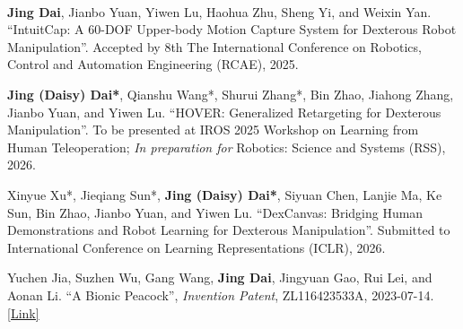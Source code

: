 
\vspace{-17mm}

\begin{cventries}
    \cventry
    {} %
    {\ } %
    {\ } %
    {} %
    {
        \begin{cvitemize2}
            \item \textbf{Jing Dai}, Jianbo Yuan, Yiwen Lu, Haohua Zhu, Sheng Yi, and Weixin Yan. ``IntuitCap: A 60-DOF Upper-body Motion Capture System for Dexterous Robot Manipulation''. Accepted by 8th The International Conference on Robotics, Control and Automation Engineering (RCAE), 2025.
            \item \textbf{Jing (Daisy) Dai*}, Qianshu Wang*, Shurui Zhang*, Bin Zhao, Jiahong Zhang, Jianbo Yuan, and Yiwen Lu. ``HOVER: Generalized Retargeting for Dexterous Manipulation''. To be presented at IROS 2025 Workshop on Learning from Human Teleoperation; \textit{In preparation for} Robotics: Science and Systems (RSS), 2026.
            \item Xinyue Xu*, Jieqiang Sun*, \textbf{Jing (Daisy) Dai*}, Siyuan Chen, Lanjie Ma, Ke Sun, Bin Zhao, Jianbo Yuan, and Yiwen Lu. ``DexCanvas: Bridging Human Demonstrations and Robot Learning for Dexterous Manipulation''. Submitted to International Conference on Learning Representations (ICLR), 2026.
            \item Yuchen Jia, Suzhen Wu, Gang Wang, \textbf{Jing Dai}, Jingyuan Gao, Rui Lei, and Aonan Li. ``A Bionic Peacock'', \textit{Invention Patent}, ZL116423533A, 2023-07-14. \href{https://pss-system.cponline.cnipa.gov.cn/documents/detail?prevPageTit=changgui}{\textcolor{link}{[Link]}}
        \end{cvitemize2}
    }
\end{cventries}
